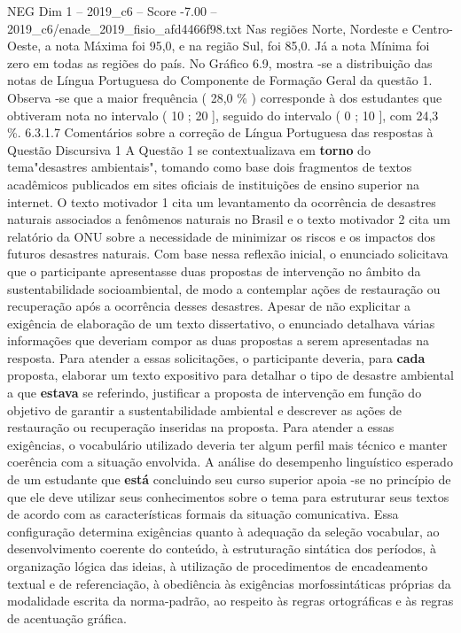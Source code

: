 \begin{textsample}{NEG Dim 1 – 2019\_c6 – Score -7.00 – 2019\_c6/enade\_2019\_fisio\_afd4466f98.txt}
Nas regiões Norte, Nordeste e Centro-Oeste, a nota Máxima foi 95,0, e na região Sul, foi 85,0.
Já a nota Mínima foi zero em todas as regiões do país.
No Gráfico 6.9, mostra -se a distribuição das notas de Língua Portuguesa do Componente de Formação Geral da questão 1.
Observa -se que a maior frequência ( 28,0 \% ) corresponde à dos estudantes que obtiveram nota no intervalo ( 10 ; 20 ], seguido do intervalo ( 0 ; 10 ], com 24,3 \%. 6.3.1.7 Comentários sobre a correção de Língua Portuguesa das respostas à Questão Discursiva 1 A Questão 1 se contextualizava em \textbf{torno} do tema"desastres ambientais", tomando como base dois fragmentos de textos acadêmicos publicados em sites oficiais de instituições de ensino superior na internet.
O texto motivador 1 cita um levantamento da ocorrência de desastres naturais associados a fenômenos naturais no Brasil e o texto motivador 2 cita um relatório da ONU sobre a necessidade de minimizar os riscos e os impactos dos futuros desastres naturais.
Com base nessa reflexão inicial, o enunciado solicitava que o participante apresentasse duas propostas de intervenção no âmbito da sustentabilidade socioambiental, de modo a contemplar ações de restauração ou recuperação após a ocorrência desses desastres.
Apesar de não explicitar a exigência de elaboração de um texto dissertativo, o enunciado detalhava várias informações que deveriam compor as duas propostas a serem apresentadas na resposta.
Para atender a essas solicitações, o participante deveria, para \textbf{cada} proposta, elaborar um texto expositivo para detalhar o tipo de desastre ambiental a que \textbf{estava} se referindo, justificar a proposta de intervenção em função do objetivo de garantir a sustentabilidade ambiental e descrever as ações de restauração ou recuperação inseridas na proposta.
Para atender a essas exigências, o vocabulário utilizado deveria ter algum perfil mais técnico e manter coerência com a situação envolvida.
A análise do desempenho linguístico esperado de um estudante que \textbf{está} concluindo seu curso superior apoia -se no princípio de que ele deve utilizar seus conhecimentos sobre o tema para estruturar seus textos de acordo com as características formais da situação comunicativa.
Essa configuração determina exigências quanto à adequação da seleção vocabular, ao desenvolvimento coerente do conteúdo, à estruturação sintática dos períodos, à organização lógica das ideias, à utilização de procedimentos de encadeamento textual e de referenciação, à obediência às exigências morfossintáticas próprias da modalidade escrita da norma-padrão, ao respeito às regras ortográficas e às regras de acentuação gráfica.

\end{textsample}
